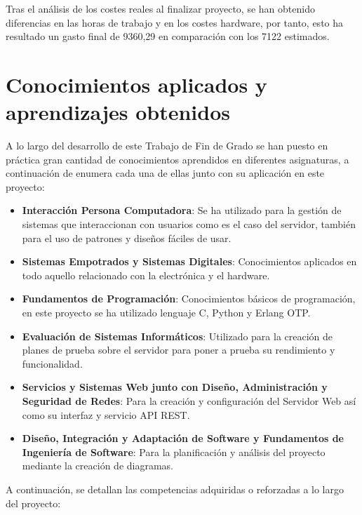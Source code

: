 Tras el análisis de los costes reales al finalizar proyecto, se han obtenido diferencias en las horas de trabajo y en los costes hardware, por tanto, esto ha resultado un gasto final de 9360,29\texteuro{} en comparación con los 7122\texteuro{} estimados.

\section{Conocimientos aplicados y aprendizajes obtenidos}

A lo largo del desarrollo de este Trabajo de Fin de Grado se han puesto en práctica gran cantidad de conocimientos aprendidos en diferentes asignaturas, a continuación de enumera cada una de ellas junto con su aplicación en este proyecto:

\begin{itemize}
    \item \textbf{Interacción Persona Computadora}: Se ha utilizado para la gestión de sistemas que interaccionan con usuarios como es el caso del servidor, también para el uso de patrones y diseños fáciles de usar.
    \item \textbf{Sistemas Empotrados y Sistemas Digitales}: Conocimientos aplicados en todo aquello relacionado con la electrónica y el hardware.
    \item \textbf{Fundamentos de Programación}: Conocimientos básicos de programación, en este proyecto se ha utilizado lenguaje C, Python y Erlang OTP.
    \item \textbf{Evaluación de Sistemas Informáticos}: Utilizado para la creación de planes de prueba sobre el servidor para poner a prueba su rendimiento y funcionalidad.
    \item \textbf{Servicios y Sistemas Web junto con Diseño, Administración y Seguridad de Redes}: Para la creación y configuración del Servidor Web así como su interfaz y servicio API REST.
    \item \textbf{Diseño, Integración y Adaptación de Software y Fundamentos de Ingeniería de Software}: Para la planificación y análisis del proyecto mediante la creación de diagramas.    
\end{itemize}

A continuación, se detallan las competencias adquiridas o reforzadas a lo largo del proyecto:


